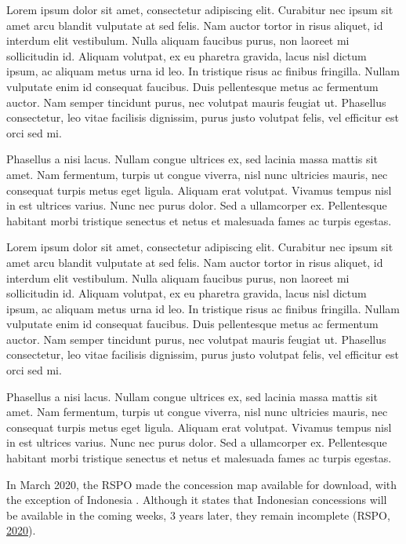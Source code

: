 \documentclass[
]{article}
\begin{document}
Lorem ipsum dolor sit amet, consectetur adipiscing elit. Curabitur nec
ipsum sit amet arcu blandit vulputate at sed felis. Nam auctor tortor in
risus aliquet, id interdum elit vestibulum. Nulla aliquam faucibus
purus, non laoreet mi sollicitudin id. Aliquam volutpat, ex eu pharetra
gravida, lacus nisl dictum ipsum, ac aliquam metus urna id leo. In
tristique risus ac finibus fringilla. Nullam vulputate enim id consequat
faucibus. Duis pellentesque metus ac fermentum auctor. Nam semper
tincidunt purus, nec volutpat mauris feugiat ut. Phasellus consectetur,
leo vitae facilisis dignissim, purus justo volutpat felis, vel efficitur
est orci sed mi.

Phasellus a nisi lacus. Nullam congue ultrices ex, sed lacinia massa
mattis sit amet. Nam fermentum, turpis ut congue viverra, nisl nunc
ultricies mauris, nec consequat turpis metus eget ligula. Aliquam erat
volutpat. Vivamus tempus nisl in est ultrices varius. Nunc nec purus
dolor. Sed a ullamcorper ex. Pellentesque habitant morbi tristique
senectus et netus et malesuada fames ac turpis egestas.

Lorem ipsum dolor sit amet, consectetur adipiscing elit. Curabitur nec
ipsum sit amet arcu blandit vulputate at sed felis. Nam auctor tortor in
risus aliquet, id interdum elit vestibulum. Nulla aliquam faucibus
purus, non laoreet mi sollicitudin id. Aliquam volutpat, ex eu pharetra
gravida, lacus nisl dictum ipsum, ac aliquam metus urna id leo. In
tristique risus ac finibus fringilla. Nullam vulputate enim id consequat
faucibus. Duis pellentesque metus ac fermentum auctor. Nam semper
tincidunt purus, nec volutpat mauris feugiat ut. Phasellus consectetur,
leo vitae facilisis dignissim, purus justo volutpat felis, vel efficitur
est orci sed mi.

Phasellus a nisi lacus. Nullam congue ultrices ex, sed lacinia massa
mattis sit amet. Nam fermentum, turpis ut congue viverra, nisl nunc
ultricies mauris, nec consequat turpis metus eget ligula. Aliquam erat
volutpat. Vivamus tempus nisl in est ultrices varius. Nunc nec purus
dolor. Sed a ullamcorper ex. Pellentesque habitant morbi tristique
senectus et netus et malesuada fames ac turpis egestas.

In March 2020, the RSPO made the concession map available for download,
with the exception of Indonesia . Although it states that Indonesian
concessions will be available in the coming weeks, 3 years later, they
remain incomplete (RSPO,
\protect\hyperlink{ref-rspoRSPOMEMBERSCONCESSION2020}{2020}).
\end{document}

